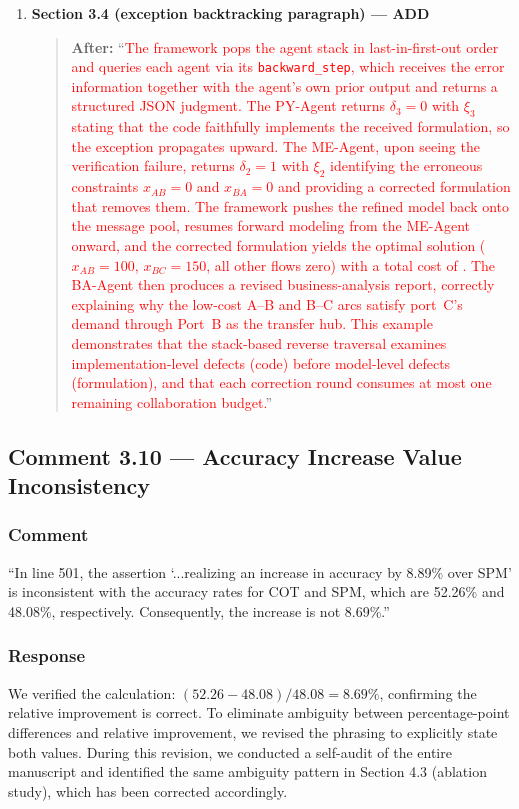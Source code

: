 \documentclass[11pt,a4paper]{article}
\begin{document}
\begin{enumerate}
\item \textbf{Section 3.4 (exception backtracking paragraph) --- ADD}
\begin{quote}
\textbf{After:} ``\textcolor{red}{The framework pops the agent stack in last-in-first-out order and queries each agent via its \texttt{backward\_step}, which receives the error information together with the agent's own prior output and returns a structured JSON judgment. The PY-Agent returns $\delta_3{=}0$ with $\xi_3$ stating that the code faithfully implements the received formulation, so the exception propagates upward. The ME-Agent, upon seeing the verification failure, returns $\delta_2{=}1$ with $\xi_2$ identifying the erroneous constraints $x_{AB}{=}0$ and $x_{BA}{=}0$ and providing a corrected formulation that removes them. The framework pushes the refined model back onto the message pool, resumes forward modeling from the ME-Agent onward, and the corrected formulation yields the optimal solution ($x_{AB}{=}100$, $x_{BC}{=}150$, all other flows zero) with a total cost of . The BA-Agent then produces a revised business-analysis report, correctly explaining why the low-cost A--B and B--C arcs satisfy port~C's demand through Port~B as the transfer hub. This example demonstrates that the stack-based reverse traversal examines implementation-level defects (code) before model-level defects (formulation), and that each correction round consumes at most one remaining collaboration budget.}''
\end{quote}
\end{enumerate}

\subsection{Comment 3.10 --- Accuracy Increase Value Inconsistency}

\subsubsection{Comment}
``In line 501, the assertion `...realizing an increase in accuracy by 8.89\% over SPM' is inconsistent with the accuracy rates for COT and SPM, which are 52.26\% and 48.08\%, respectively. Consequently, the increase is not 8.69\%.''

\subsubsection{Response}
We verified the calculation: $(52.26-48.08)/48.08 = 8.69\%$, confirming the relative improvement is correct. To eliminate ambiguity between percentage-point differences and relative improvement, we revised the phrasing to explicitly state both values. During this revision, we conducted a self-audit of the entire manuscript and identified the same ambiguity pattern in Section 4.3 (ablation study), which has been corrected accordingly.
\end{document}
